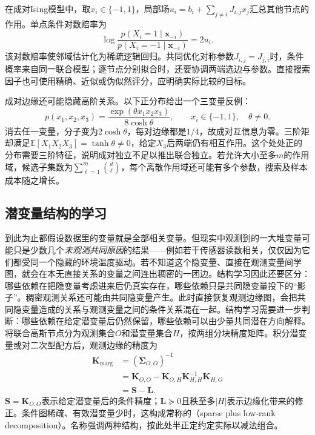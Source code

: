 在成对Ising模型中，取$x_i\in\{-1,1\}$，局部场$u_i=b_i+\sum_{j\ne i}J_{i,j}x_j$汇总其他节点的作用。单点条件对数赔率为
\[
  \log\frac{p(X_i=1\mid\bm{x}_{-i})}
                {p(X_i=-1\mid\bm{x}_{-i})}=2u_i.
\]
该对数赔率使邻域估计化为稀疏逻辑回归。共同优化对称参数$J_{i,j}=J_{j,i}$时，条件概率来自同一联合模型；逐节点分别拟合时，还要协调两端选边与参数。直接搜索因子也可使用精确、近似或伪似然评分，应明确实际比较的目标。

成对边缘还可能隐藏高阶关系。以下正分布给出一个三变量反例：
\[
  p(x_1,x_2,x_3)
  =\frac{\exp(\theta x_1x_2x_3)}{8\cosh\theta},
  \qquad x_i\in\{-1,1\},\quad \theta\ne0.
\]
消去任一变量，分子变为$2\cosh\theta$，每对边缘都是$1/4$，故成对互信息为零。三阶矩却满足$\mathbb{E}[X_1X_2X_3]=\tanh\theta\ne0$，给定$X_3$后两端仍有相互作用。这个处处正的分布需要三阶特征，说明成对独立不足以推出联合独立。若允许大小至多$m$的作用域，候选子集数为$\sum_{\ell=1}^{m}\binom d\ell$，每个离散作用域还可能有多个参数，搜索及样本成本随之增长。

\subsection{潜变量结构的学习}
\label{sec:pgm-structure-learning-latent}

到此为止都假设数据里的变量就是全部相关变量。但现实中观测到的一大堆变量可能只是少数几个\emph{未观测共同原因}的结果——例如若干传感器读数相关，仅仅因为它们都受同一个隐藏的环境温度驱动。若不知道这个隐变量、直接在观测变量间学图，就会在本无直接关系的变量之间连出稠密的一团边。结构学习因此还要区分：哪些依赖在把隐变量考虑进来后仍真实存在，哪些依赖只是共同隐变量投下的“影子”。稠密观测关系还可能由共同隐变量产生。此时直接恢复观测边缘图，会把共同隐变量造成的关系与观测变量之间的条件关系混在一起。结构学习需要进一步判断：哪些依赖在给定潜变量后仍然保留，哪些依赖可以由少量共同潜在方向解释。将联合高斯节点分为观测集合$O$和潜变量集合$H$，按两组分块精度矩阵。积分潜变量或对二次型配方后，观测边缘的精度为
\begin{equation}
  \begin{aligned}
    \bm{K}_{\mathrm{marg}}
      &=(\bm{\Sigma}_{O,O})^{-1}\\
      &=\bm{K}_{O,O}
        -\bm{K}_{O,H}\bm{K}_{H,H}^{-1}\bm{K}_{H,O}\\
      &=\bm{S}-\bm{L}.
  \end{aligned}
  \label{eq:pgm-structure-learning-schur}
\end{equation}
$\bm{S}=\bm{K}_{O,O}$表示给定潜变量后的条件精度；$\bm{L}\succeq0$且秩至多$|H|$表示边缘化带来的修正。条件图稀疏、有效潜变量少时，这构成常称的（sparse plus low-rank decomposition）。名称强调两种结构，按此处半正定约定实际以减法组合。

